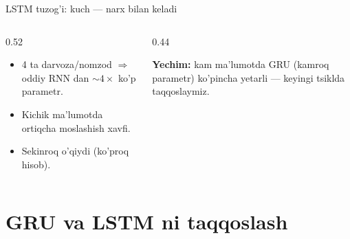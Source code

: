 \documentclass[aspectratio=169,11pt]{beamer}
\begin{document}
\begin{frame}{LSTM tuzog'i: kuch --- narx bilan keladi}
  \begin{columns}[T]
    \begin{column}{0.52\textwidth}
      \begin{tcolorbox}[warnbox,title=Hisoblash narxi]
        \small
        \begin{itemize}\setlength\itemsep{2pt}
          \item 4 ta darvoza/nomzod $\Rightarrow$ oddiy RNN dan $\sim 4\times$ ko'p
                parametr.
          \item Kichik ma'lumotda ortiqcha moslashish xavfi.
          \item Sekinroq o'qiydi (ko'proq hisob).
        \end{itemize}
      \end{tcolorbox}
    \end{column}
    \begin{column}{0.44\textwidth}
      \begin{tcolorbox}[okbox,top=2pt,bottom=2pt]
        \footnotesize
        \textbf{Yechim:} kam ma'lumotda GRU (kamroq parametr) ko'pincha yetarli
        --- keyingi tsiklda taqqoslaymiz.
      \end{tcolorbox}
    \end{column}
  \end{columns}
\end{frame}

\section[Taqqoslash]{GRU va LSTM ni taqqoslash}
\end{document}
